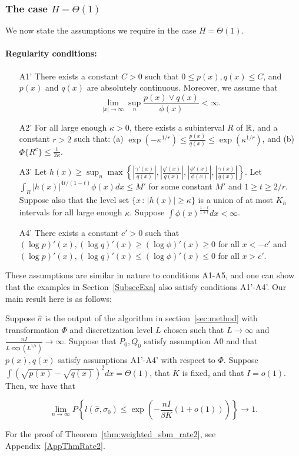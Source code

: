 \documentclass{article}
\begin{document}
\subsubsection{The case $H = \Theta(1)$}

We now state the assumptions we require in the case $H = \Theta(1)$.

\paragraph{\textbf{Regularity conditions:}} 

\begin{enumerate}
\item[A1'] There exists a constant $C >0$ such that $0 \leq p(x), q(x) \leq C$, and $p(x)$ and $q(x)$ are absolutely continuous.  Moreover, we assume that 
$$\lim_{|x| \rightarrow \infty} \sup_n \frac{p(x) \vee q(x)}{\phi(x)} < \infty.$$
\item[A2'] For all large enough $\kappa > 0$, there exists a subinterval $R$ of ${\mathbb R}$, and a constant $r > 2$ such that: (a) $\exp(-\kappa^{1/r}) \leq \frac{p(x)}{q(x)} \leq \exp(\kappa^{1/r})$, and (b) $\Phi \{ R^c \} \leq \frac{1}{2\kappa}.$
\item[A3'] Let $h(x) \geq \sup_n \max \left\{  \left|\frac{\gamma'(x)}{q(x)} \right|, 
 \left|\frac{q'(x)}{q(x)}\right|, \left| \frac{\phi'(x)}{\phi(x)}\right|, \left | \frac{\gamma(x)}{q(x)} \right|  \right\} $. Let $\int_R |h(x)|^{4t/(1-t)} \phi(x) dx \leq M'$ for some constant $M'$ and $1 \geq t \geq 2/r$. Suppose also that the level set $\{x \,:\, |h(x)| \geq \kappa\}$ is a union of at most $K_h$ intervals for all large enough $\kappa$. Suppose $\int \phi(x)^{\frac{1-t}{1+t}} dx < \infty$.
\item[A4']  There exists a constant $c'>0$ such that $(\log p)'(x), (\log q)'(x) \geq (\log \phi)'(x) \geq 0$ for all $x < -c'$ and $ (\log p)'(x), (\log q)'(x) \leq (\log \phi)'(x) \leq 0$ for all $x > c'$.
\end{enumerate}

These assumptions are similar in nature to conditions A1-A5, and one can show that the examples in Section~\ref{SubsecExa} also satisfy conditions A1'-A4'. Our main result here is as follows:

\begin{theorem}
\label{thm:weighted_sbm_rate2}
Suppose $\hat{\sigma}$ is the output of the algorithm in section~\ref{sec:method} with transformation $\Phi$ and discretization level $L$ chosen such that $L \rightarrow \infty$ and $\frac{n I}{ L \exp(L^{1/r}) } \rightarrow \infty$. Suppose that $P_0, Q_0$ satisfy assumption A0 and that $p(x), q(x)$ satisfy assumptions A1'-A4' with respect to $\Phi$. Suppose $\int (\sqrt{p(x)} - \sqrt{q(x)})^2 dx = \Theta(1)$, that $K$ is fixed, and that $I = o(1)$. Then, we have that

\[
\lim_{n \rightarrow \infty} P \left\{
     l(\hat{\sigma}, \sigma_0) \leq \exp\left( - \frac{nI}{\beta K} (1 + o(1)) \right)
    \right\} \rightarrow 1.
\]
\end{theorem}
For the proof of Theorem~\ref{thm:weighted_sbm_rate2}, see Appendix~\ref{AppThmRate2}.
\end{document}
